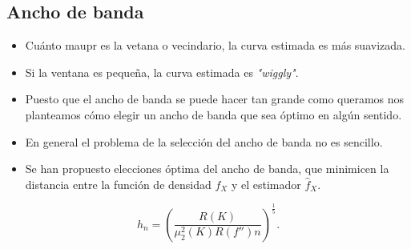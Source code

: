 \subsection{Ancho de banda}
\begin{tcolorbox}[colback=blue!5!white, colframe=blue!75!black, title=\textbf{Si variamos el ancho de banda:}]
\begin{itemize}[label=\textbullet]
    \item Cuánto maupr es la vetana o vecindario, la curva estimada es más suavizada.
    \item Si la ventana es pequeña, la curva estimada es \textit{"wiggly"}.
    \item Puesto que el ancho de banda se puede hacer tan grande como queramos nos planteamos cómo elegir un ancho de banda que sea óptimo en algún sentido.
    \item En general el problema de la selección del ancho de banda no es sencillo.
    \item Se han propuesto elecciones óptima del ancho de banda, que minimicen la distancia entre la función de densidad $f_X$ y el estimador  $\hat{f}_X$.
\end{itemize}

\end{tcolorbox}
\begin{tcolorbox}[colback=red!5!white, colframe=red!75!black, title=\textbf{Elección óptima del ancho de banda}]
\[
    h_n=\left( \dfrac{R(K)}{\mu_2^2(K)R(f'')n} \right)^{\frac{1}{5} }. 
\]
\end{tcolorbox}
